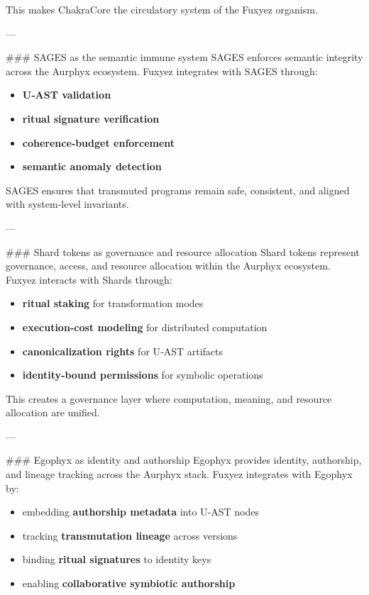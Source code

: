 \documentclass[12pt, a4paper]{book}
\begin{document}
This makes ChakraCore the circulatory system of the Fuxyez organism.

---

\#\#\# SAGES as the semantic immune system  
SAGES enforces semantic integrity across the Aurphyx ecosystem. Fuxyez integrates with SAGES through:

\begin{itemize}
  \item \textbf{U‑AST validation}  
  \item \textbf{ritual signature verification}  
  \item \textbf{coherence‑budget enforcement}  
  \item \textbf{semantic anomaly detection}  
\end{itemize}

SAGES ensures that transmuted programs remain safe, consistent, and aligned with system‑level invariants.

---

\#\#\# Shard tokens as governance and resource allocation  
Shard tokens represent governance, access, and resource allocation within the Aurphyx ecosystem. Fuxyez interacts with Shards through:

\begin{itemize}
  \item \textbf{ritual staking} for transformation modes  
  \item \textbf{execution‑cost modeling} for distributed computation  
  \item \textbf{canonicalization rights} for U‑AST artifacts  
  \item \textbf{identity‑bound permissions} for symbolic operations  
\end{itemize}

This creates a governance layer where computation, meaning, and resource allocation are unified.

---

\#\#\# Egophyx as identity and authorship  
Egophyx provides identity, authorship, and lineage tracking across the Aurphyx stack. Fuxyez integrates with Egophyx by:

\begin{itemize}
  \item embedding \textbf{authorship metadata} into U‑AST nodes  
  \item tracking \textbf{transmutation lineage} across versions  
  \item binding \textbf{ritual signatures} to identity keys  
  \item enabling \textbf{collaborative symbiotic authorship}  
\end{itemize}
\end{document}

